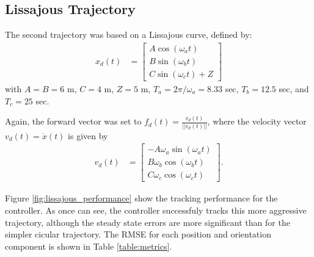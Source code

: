 \documentclass[paper=letter, fontsize=11pt]{scrartcl} %
\numberwithin{equation}{section} %
\numberwithin{figure}{section} %
\numberwithin{table}{section} %
\begin{document}
\pagebreak
\subsection{Lissajous Trajectory}
The second trajectory was based on a Lissajous curve, defined by:
\begin{align}
  x_d(t) &=
  \begin{bmatrix}
    A \cos(\omega_a t) \\
    B \sin(\omega_b t) \\
    C \sin(\omega_c t) + Z
  \end{bmatrix}
\end{align}
with $A = B = 6$ m, $C = 4$ m, $Z = 5$ m, $T_a = 2 \pi/ \omega_a = 8.33$ sec,
$T_b = 12.5$ sec, and $T_c = 25$ sec.

Again, the forward vector was set to $f_d(t) = \frac{v_d(t)}{||v_d(t)||}$, where the
velocity vector $v_d(t) = \dot{x}(t)$ is given by
\begin{align}
  v_d(t) &=
  \begin{bmatrix}
    -A \omega_a \sin(\omega_a t) \\
    B \omega_b \cos(\omega_b t) \\
    C \omega_c \cos(\omega_c t)
  \end{bmatrix}.
\end{align}

Figure \ref{fig:lissajous_performance} show the tracking
performance for the controller. As once can see, the controller successfuly
tracks this more aggressive trajectory, although the steady state errors are
more significant than for the simpler cicular trajectory. The RMSE for each
position and orientation component is shown in Table \ref{table:metrics}.
\end{document}
